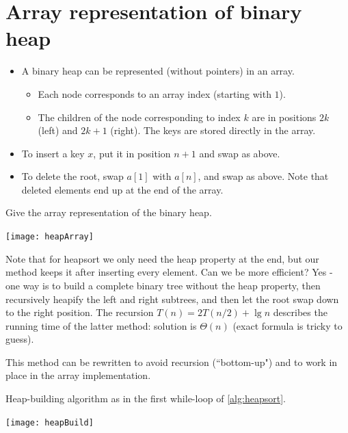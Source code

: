 \section{Array representation of binary heap}
\begin{itemize}
  \item A binary heap can be represented  (without pointers) in an array. 
  \begin{itemize}
	\item Each node corresponds to an array index (starting with $1$). 
	\item The children of the node corresponding to index $k$ are in positions $2k$ (left) 
	and $2k+1$ (right). The keys are stored directly in the array.
  \end{itemize}
  \item To insert a key $x$, put it in position $n+1$ and swap as above.
  \item To delete the root, swap $a[1]$ with $a[n]$, and swap as above. 
  Note that deleted elements end up at the end of the array.
\end{itemize}

\begin{Boxample}[0]
Give the array representation of the binary heap.
\begin{center}
\texttt{[image: heapArray]}
\end{center}
\end{Boxample}

Note that for heapsort we only need the heap property at the end, but our method keeps it after inserting every element. 
Can we be more efficient? Yes - one way is to build a complete binary tree without the heap property, then
recursively heapify the left and right subtrees, and then let the root swap 
down to the right position. The recursion $T(n) = 2T(n/2) + \lg n$ describes the running time of the 
latter method: solution is $\Theta(n)$ (exact formula is tricky to guess).
 
This method can be rewritten to avoid recursion (``bottom-up") and to work 
in place in the array implementation. 

\begin{Boxample}\label{ex:heapbuild}
Heap-building algorithm as in the first while-loop of \cref{alg:heapsort}.
\begin{center}
\texttt{[image: heapBuild]}
\end{center}
\end{Boxample}

